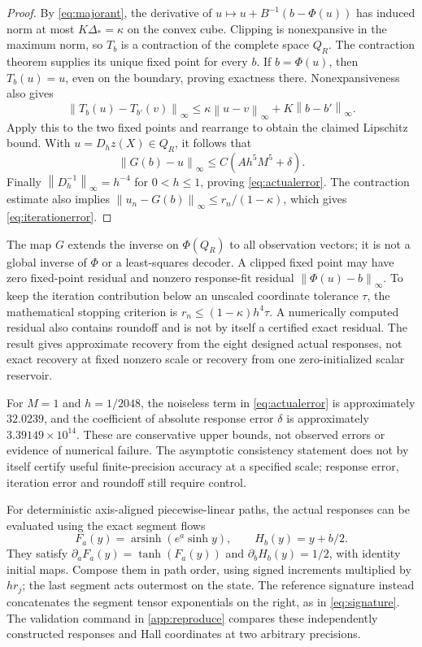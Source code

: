 \documentclass[11pt,a4paper]{article}
\numberwithin{equation}{section}
\theoremstyle{definition}
\theoremstyle{remark}
\newcommand{\norm}[1]{\left\lVert #1\right\rVert}
\begin{document}
\begin{proof}
By \eqref{eq:majorant}, the derivative of
$u\mapsto u+B^{-1}(b-\Phi(u))$ has induced norm at most
$K\Delta_*=\kappa$ on the convex cube. Clipping is nonexpansive in the
maximum norm, so $T_b$ is a contraction of the complete space $Q_R$.
The contraction theorem supplies its unique fixed point for every $b$.
If $b=\Phi(u)$, then $T_b(u)=u$, even on the boundary, proving exactness
there. Nonexpansiveness also gives
\[
 \norm{T_b(u)-T_{b'}(v)}_\infty
 \leq\kappa\norm{u-v}_\infty+K\norm{b-b'}_\infty.
\]
Apply this to the two fixed points and rearrange to obtain the claimed
Lipschitz bound. With $u=D_hz(X)\in Q_R$, it follows that
\[
 \norm{G(b)-u}_\infty\leq C(Ah^5M^5+\delta).
\]
Finally $\norm{D_h^{-1}}_\infty=h^{-4}$ for $0<h\leq1$, proving
\eqref{eq:actualerror}. The contraction estimate also implies
$\norm{u_n-G(b)}_\infty\leq r_n/(1-\kappa)$, which gives
\eqref{eq:iterationerror}.
\end{proof}

The map $G$ extends the inverse on $\Phi(Q_R)$ to all observation vectors;
it is not a global inverse of $\Phi$ or a least-squares decoder. A clipped
fixed point may have zero fixed-point residual and nonzero response-fit
residual $\norm{\Phi(u)-b}_\infty$. To keep the iteration contribution
below an unscaled coordinate tolerance $\tau$, the mathematical stopping
criterion is $r_n\leq(1-\kappa)h^4\tau$. A numerically computed residual
also contains roundoff and is not by itself a certified exact residual.
The result gives approximate recovery from the eight designed actual
responses, not exact recovery at fixed nonzero scale or recovery from one
zero-initialized scalar reservoir.

For $M=1$ and $h=1/2048$, the noiseless term in
\eqref{eq:actualerror} is approximately $32.0239$, and the coefficient
of absolute response error $\delta$ is approximately
$3.39149\times10^{14}$. These are conservative upper bounds, not observed
errors or evidence of numerical failure. The asymptotic consistency
statement does not by itself certify useful finite-precision accuracy at
a specified scale; response error, iteration error and roundoff still
require control.

For deterministic axis-aligned piecewise-linear paths, the actual responses
can be evaluated using the exact segment flows
\[
 F_a(y)=\operatorname{arsinh}(e^a\sinh y),\qquad H_b(y)=y+b/2.
\]
They satisfy $\partial_aF_a(y)=\tanh(F_a(y))$ and
$\partial_bH_b(y)=1/2$, with identity initial maps. Compose them in path
order, using signed increments multiplied by $hr_j$; the last segment acts
outermost on the state. The reference signature instead concatenates the
segment tensor exponentials on the right, as in \eqref{eq:signature}.
The validation command in \cref{app:reproduce} compares these independently
constructed responses and Hall coordinates at two arbitrary precisions.
\end{document}
